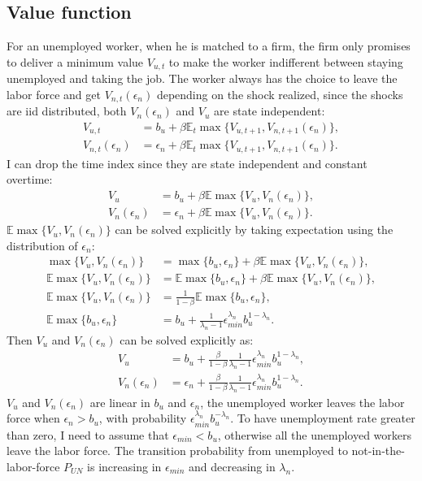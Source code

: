 \documentclass[12pt]{article}
\newcommand{\E}{\mathbb{E}}
\newcommand{\1}{\mathbb{1}}
\begin{document}
\subsection{Value function}
For an unemployed worker, when he is matched to a firm, the firm only promises to deliver a minimum value $V_{u,t}$ to make the worker indifferent between staying unemployed and taking the job. The worker always has the choice to leave the labor force and get $V_{n,t}(\epsilon_n)$ depending on the shock realized, since the shocks are iid distributed, both $V_n(\epsilon_n)$ and $V_u$ are state independent: 
\begin{align*}
V_{u,t} &= b_u+\beta\E_t\max\{V_{u,t+1},V_{n,t+1}(\epsilon_n)\}, \\
V_{n,t}(\epsilon_n) &= \epsilon_n+\beta\E_t\max\{V_{u,t+1},V_{n,t+1}(\epsilon_n)\}.
\end{align*}
I can drop the time index since they are state independent and constant overtime:
\begin{align*}
V_u &= b_u+\beta\E\max\{V_u,V_n(\epsilon_n)\}, \\
V_n(\epsilon_n) &= \epsilon_n+\beta\E\max\{V_u,V_n(\epsilon_n)\}. 
\end{align*}
$\E\max\{V_u,V_n(\epsilon_n)\}$ can be solved explicitly by taking expectation using the distribution of $\epsilon_n$:
\begin{align*}
\max\{V_u,V_n(\epsilon_n)\} &= \max \{b_u,\epsilon_n\}+\beta\E\max\{V_u,V_n(\epsilon_n)\}, \\
\E\max\{V_u,V_n(\epsilon_n)\} &= \E\max \{b_u,\epsilon_n\}+\beta\E\max\{V_u,V_n(\epsilon_n)\},  \\
\E\max\{V_u,V_n(\epsilon_n)\} &= \frac{1}{1-\beta}\E\max \{b_u,\epsilon_n\},  \\
\E\max \{b_u,\epsilon_n\}  &= b_u+\frac{1}{\lambda_n-1}\epsilon_{min}^{\lambda_n}b_u^{1-\lambda_n}.
\end{align*}
Then $V_u$ and $V_n(\epsilon_n)$ can be solved explicitly as:  
\begin{align}
\label{V_u}
V_u &= b_u+\frac{\beta}{1-\beta}\frac{1}{\lambda_n-1}\epsilon_{min}^{\lambda_n}b_u^{1-\lambda_n}, \\
\label{V_n}
V_n(\epsilon_n) &= \epsilon_n+\frac{\beta}{1-\beta}\frac{1}{\lambda_n-1}\epsilon_{min}^{\lambda_n}b_u^{1-\lambda_n}. 
\end{align}
$V_u$ and $V_n(\epsilon_n)$ are linear in $b_u$ and $\epsilon_n$, the unemployed worker leaves the labor force when $\epsilon_n>b_u$, with probability $\epsilon_{min}^{\lambda_n}b_u^{-\lambda_n}$. To have unemployment rate greater than zero, I need to assume that $\epsilon_{min}<b_u$, otherwise all the unemployed workers leave the labor force. The transition probability from unemployed to not-in-the-labor-force $P_{UN}$ is increasing in $\epsilon_{min}$ and decreasing in $\lambda_n$. 
\end{document}
